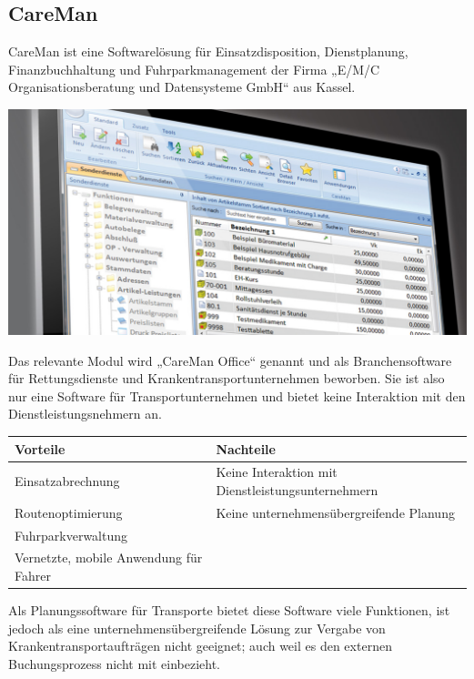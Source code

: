 \documentclass[a4paper, ngerman, 12pt]{scrartcl}
\begin{document}
\subsection{CareMan}
CareMan ist eine Softwarelösung für Einsatzdisposition, Dienstplanung, Finanzbuchhaltung und Fuhrparkmanagement der Firma „E/M/C Organisationsberatung und Datensysteme GmbH“ aus Kassel.
\begin{center}
\begin{minipage}{0.8\textwidth}
	\centering
	\includegraphics[width=\textwidth]{Bilder/careman.jpg}
	\label{img:careman}
\end{minipage}
\end{center}
Das relevante Modul wird „CareMan Office“ genannt und als Branchensoftware für Rettungsdienste und Krankentransportunternehmen beworben. Sie ist also nur eine Software für Transportunternehmen und bietet keine Interaktion mit den Dienstleistungsnehmern an.
\begin{center}
\begin{tabular}{|p{}|p{}|}
\hline
\cellcolor{lightgray}\textbf{Vorteile}	&\cellcolor{lightgray}\textbf{Nachteile}\\
\hline
Einsatzabrechnung	&Keine Interaktion mit Dienstleistungsunternehmern\\
\hline
Routenoptimierung	&Keine unternehmensübergreifende Planung\\
\hline
Fuhrparkverwaltung	&\\
\hline
Vernetzte, mobile Anwendung für Fahrer	&\\
\hline
\end{tabular}
\end{center}
Als Planungssoftware für Transporte bietet diese Software viele Funktionen, ist jedoch als eine unternehmensübergreifende Lösung zur Vergabe von Krankentransportaufträgen nicht geeignet; auch weil es den externen Buchungsprozess nicht mit einbezieht.
\end{document}
